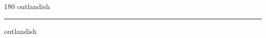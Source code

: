 
\begin{frame}
\begin{center}
\begin{turn}{180}
{\fontsize{2.5cm}{1em}\selectfont outlandish}
\end{turn}
\vspace{1em}\par  
\hrule
\vspace{1em}\par  
{\fontsize{2.5cm}{1em}\selectfont outlandish}
\end{center}
\end{frame}
